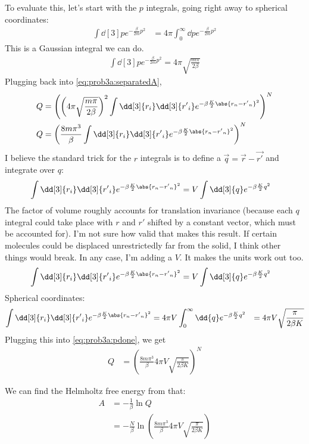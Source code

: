 \documentclass[../../PS3.tex]{subfiles}
\begin{document}
To evaluate this, let's start with the $p$ integrals, going right away to spherical coordinates:
\begin{align}
	\int \dd[3]{p} e^{-\frac{\beta}{2m} p^2} &= 4\pi \int_0^{\infty} \dd{p} e^{-\frac{\beta}{2m} p^2} 
\end{align}
This is a Gaussian integral we can do.
\begin{align}
	\int \dd[3]{p} e^{-\frac{\beta}{2m} p^2} = 4\pi \sqrt{\frac{m \pi}{2 \beta}}
\end{align}
Plugging back into \eqref{eq:prob3a:separatedA},
\begin{align}
	Q &= \left( \left(4\pi \sqrt{\frac{m \pi}{2 \beta}} \right)^2  \int \dd[3]{r_i} \dd[3]{{r'}_i} e^{-\beta \frac{K}{2} \abs{r_n - {r'}_n}^2 }\right) ^N \\
	\label{eq:prob3a:pdone} Q &= \left( \frac{8 m \pi^3 }{ \beta}  \int \dd[3]{r_i} \dd[3]{{r'}_i} e^{-\beta \frac{K}{2} \abs{r_n - {r'}_n}^2 }\right) ^N	
\end{align}
I believe the standard trick for the $r$ integrals is to define a $\vec{q} = \vec{r} - \vec{r'}$ and integrate over $q$:
\begin{align}
	\int \dd[3]{r_i} \dd[3]{{r'}_i} e^{-\beta \frac{K}{2} \abs{r_n - {r'}_n}^2 } &= V \int \dd[3]{q} e^{-\beta \frac{K}{2} q^2 }
\end{align}
The factor of volume roughly accounts for translation invariance (because each $q$ integral could take place with $r$ and $r'$ shifted by a constant vector, which must be accounted for). I'm not sure how valid that makes this result. If certain molecules could be displaced unrestrictedly far from the solid, I think other things would break. In any case, I'm adding a $V$. It makes the units work out too.
\begin{align}
	\int \dd[3]{r_i} \dd[3]{{r'}_i} e^{-\beta \frac{K}{2} \abs{r_n - {r'}_n}^2 } &= V \int \dd[3]{q} e^{-\beta \frac{K}{2} q^2 }
\end{align}
Spherical coordinates:
\begin{align}
	\int \dd[3]{r_i} \dd[3]{{r'}_i} e^{-\beta \frac{K}{2} \abs{r_n - {r'}_n}^2 } &= 4\pi V \int_0^{\infty} \dd{q} e^{-\beta \frac{K}{2} q^2 }
	&= 4 \pi V \sqrt{\frac{\pi}{2 \beta K}}
\end{align}
Plugging this into \eqref{eq:prob3a:pdone}, we get
\begin{align}
	 Q &= \left( \frac{8 m \pi^3 }{ \beta}  4 \pi V \sqrt{\frac{\pi}{2 \beta K}} \right) ^N
\end{align}

We can find the Helmholtz free energy from that:
\begin{align}
	A &= -\frac{1}{\beta} \ln{Q} \\
	&= - \frac{N}{\beta} \ln(\frac{8 m \pi^3 }{ \beta}  4 \pi V \sqrt{\frac{\pi}{2 \beta K}})
\end{align}
\end{document}

